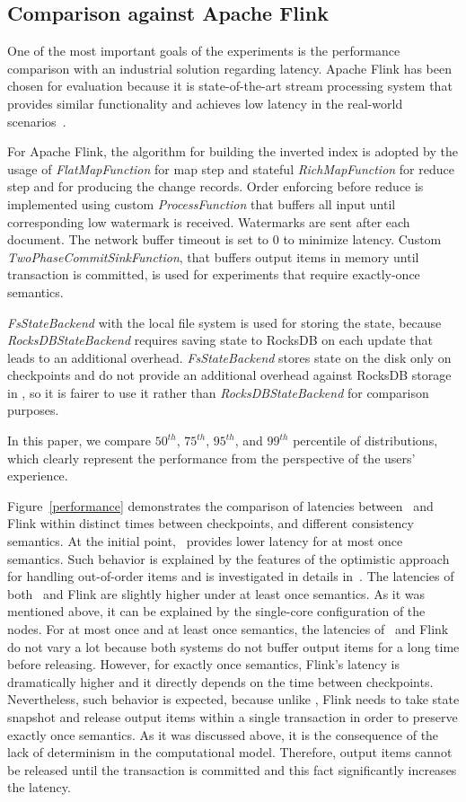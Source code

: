 \subsection{Comparison against Apache Flink}
One of the most important goals of the experiments is the performance comparison with an industrial solution regarding latency. Apache Flink has been chosen for evaluation because it is state-of-the-art stream processing system that provides similar functionality and achieves low latency in the real-world scenarios~\cite{S7530084}. 

For Apache Flink, the algorithm for building the inverted index is adopted by the usage of {\it FlatMapFunction} for map step and stateful {\it RichMapFunction} for reduce step and for producing the change records. Order enforcing before reduce is implemented using custom {\it ProcessFunction} that buffers all input until corresponding low watermark is received. Watermarks are sent after each document. The network buffer timeout is set to 0 to minimize latency. Custom {\it TwoPhaseCommitSinkFunction}, that buffers output items in memory until transaction is committed, is used for experiments that require exactly-once semantics. 

{\it FsStateBackend} with the local file system is used for storing the state, because {\it RocksDBStateBackend} requires saving state to RocksDB on each update that leads to an additional overhead. {\it FsStateBackend} stores state on the disk only on checkpoints and do not provide an additional overhead against RocksDB storage in \FlameStream, so it is fairer to use it rather than {\it RocksDBStateBackend} for comparison purposes.

In this paper, we compare $50^{th}$, $75^{th}$, $95^{th}$, and $99^{th}$ percentile of distributions, which clearly represent the performance from the perspective of the users' experience.

Figure~\ref{performance} demonstrates the comparison of latencies between \FlameStream\ and Flink within distinct times between checkpoints, and different consistency semantics. At the initial point, \FlameStream\ provides lower latency for at most once semantics. Such behavior is explained by the features of the optimistic approach for handling out-of-order items and is investigated in details in~\cite{we2018seim}. The latencies of both \FlameStream\ and Flink are slightly higher under at least once semantics. As it was mentioned above, it can be explained by the single-core configuration of the nodes. For at most once and at least once semantics, the latencies of \FlameStream\ and Flink do not vary a lot because both systems do not buffer output items for a long time before releasing. However, for exactly once semantics, Flink's latency is dramatically higher and it directly depends on the time between checkpoints. Nevertheless, such behavior is expected, because unlike \FlameStream, Flink needs to take state snapshot and release output items within a single transaction in order to preserve exactly once semantics. As it was discussed above, it is the consequence of the lack of determinism in the computational model. Therefore, output items cannot be released until the transaction is committed and this fact significantly increases the latency. 

